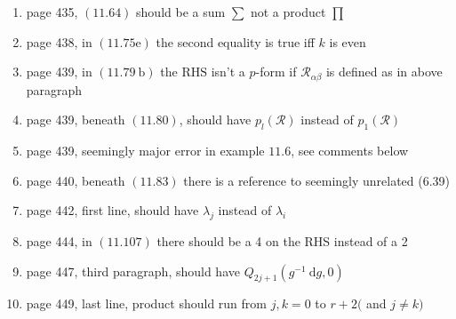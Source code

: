 \documentclass{article}
\begin{document}
\begin{enumerate}
\item page 435, $(11.64)$ should be a sum $\sum$ not a product $\prod$

\item page 438, in $(11.75 \mathrm{e})$ the second equality is true iff $k$ is even

\item page 439, in $(11.79 \mathrm{~b})$ the $\mathrm{RHS}$ isn't a $p$-form if $\mathcal{R}_{\alpha \beta}$ is defined as in above paragraph

\item page 439, beneath $(11.80)$, should have $p_{l}(\mathcal{R})$ instead of $p_{1}(\mathcal{R})$

\item page 439, seemingly major error in example $11.6$, see comments below

\item page 440, beneath $(11.83)$ there is a reference to seemingly unrelated (6.39)

\item page 442, first line, should have $\lambda_{j}$ instead of $\lambda_{i}$

\item page 444, in $(11.107)$ there should be a 4 on the RHS instead of a 2

\item page 447, third paragraph, should have $Q_{2 j+1}\left(g^{-1} \mathrm{~d} g, 0\right)$

\item page 449, last line, product should run from $j, k=0$ to $r+2($ and $j \neq k)$
\end{enumerate}
\end{document}
